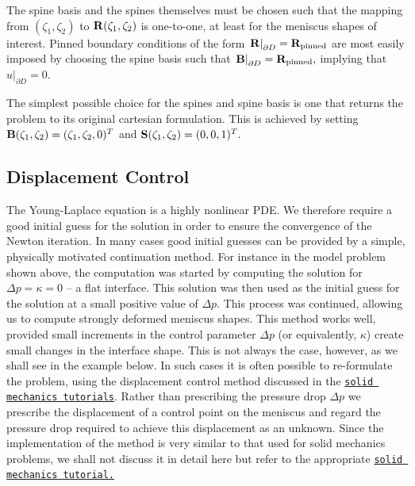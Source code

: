 The spine basis and the spines themselves must be chosen such that the mapping from $(\zeta_1,\zeta_2)$ to ${\bf R}(\zeta_1,\zeta_2)$ is one-\/to-\/one, at least for the meniscus shapes of interest. Pinned boundary conditions of the form $ \left. {\bf R}\right|_{\partial D} = {\bf R}_{\rm pinned} $ are most easily imposed by choosing the spine basis such that $ \left. {\bf B}\right|_{\partial D} = {\bf R}_{\rm pinned}, $ implying that $ \left. u\right|_{\partial D} = 0. $

The simplest possible choice for the spines and spine basis is one that returns the problem to its original cartesian formulation. This is achieved by setting $ {\bf B}(\zeta_1,\zeta_2) = (\zeta_1,\zeta_2,0)^T $ and $ {\bf S}(\zeta_1,\zeta_2) = (0,0,1)^T. $\hypertarget{index_displ}{}\subsection{Displacement Control}\label{index_displ}
The Young-\/\+Laplace equation is a highly nonlinear P\+DE. We therefore require a good initial guess for the solution in order to ensure the convergence of the Newton iteration. In many cases good initial guesses can be provided by a simple, physically motivated continuation method. For instance in the model problem shown above, the computation was started by computing the solution for $ \Delta p = \kappa = 0 $ -- a flat interface. This solution was then used as the initial guess for the solution at a small positive value of $ \Delta p $. This process was continued, allowing us to compute strongly deformed meniscus shapes. This method works well, provided small increments in the control parameter $ \Delta p $ (or equivalently, $ \kappa $) create small changes in the interface shape. This is not always the case, however, as we shall see in the example below. In such cases it is often possible to re-\/formulate the problem, using the displacement control method discussed in the \href{../../../beam/steady_ring/html/index.html}{\tt solid mechanics tutorials}. Rather than prescribing the pressure drop $ \Delta p $ we prescribe the displacement of a control point on the meniscus and regard the pressure drop required to achieve this displacement as an unknown. Since the implementation of the method is very similar to that used for solid mechanics problems, we shall not discuss it in detail here but refer to the appropriate \href{../../../beam/steady_ring/html/index.html}{\tt solid mechanics tutorial.}



